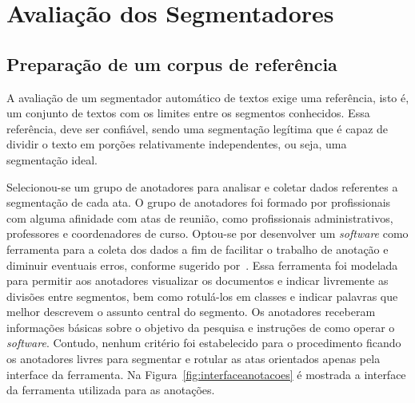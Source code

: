 \chapter{Avaliação dos Segmentadores}\label{cap-segmentadores}




\section{Preparação de um corpus de referência}

A avaliação de um segmentador automático de textos exige uma referência, isto é, um conjunto de textos com os limites entre os segmentos conhecidos. Essa referência, deve ser confiável, sendo uma segmentação legítima que é capaz de dividir o texto em porções relativamente independentes, ou seja, uma segmentação ideal.


Selecionou-se um grupo de anotadores para analisar e coletar dados referentes a segmentação de cada ata. O grupo de anotadores foi formado por profissionais com alguma afinidade com atas de reunião, como profissionais administrativos, professores e coordenadores de curso. Optou-se por desenvolver um \textit{software} como ferramenta para a coleta dos dados a fim de facilitar o trabalho de anotação e diminuir eventuais erros, conforme sugerido por~\cite{Hovy2010}. Essa ferramenta foi modelada para permitir aos anotadores visualizar os documentos e indicar livremente as divisões entre segmentos, bem como rotulá-los em classes e indicar palavras que melhor descrevem o assunto central do segmento.
Os anotadores receberam informações básicas sobre o objetivo da pesquisa e instruções de como operar o \textit{software}. Contudo, nenhum critério foi estabelecido para o procedimento ficando os anotadores livres para segmentar e rotular as atas orientados apenas pela interface da ferramenta. Na Figura~\ref{fig:interfaceanotacoes} é mostrada a interface da ferramenta utilizada para as anotações.

